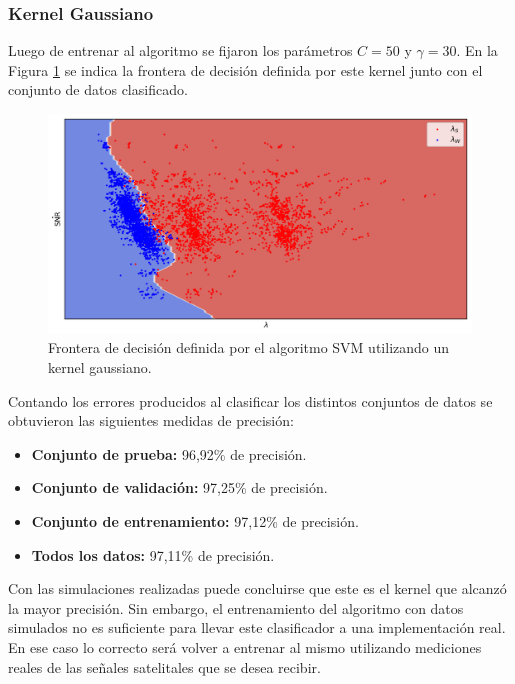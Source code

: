 \subsubsection{Kernel Gaussiano}
Luego de entrenar al algoritmo se fijaron los parámetros $C=50$ y $\gamma=30$. En la Figura \ref{fig:ml_svm_rbf} se indica la frontera de decisión definida por este kernel junto con el conjunto de datos clasificado.

\begin{figure}[ht!]
  \centering
  \includegraphics[width=0.9\linewidth]{images/05-Machine Learning/ml_svm_rbf.png}
  \caption{Frontera de decisión definida por el algoritmo SVM utilizando un kernel gaussiano.}
  \label{fig:ml_svm_rbf}
\end{figure}

Contando los errores producidos al clasificar los distintos conjuntos de datos se obtuvieron las siguientes medidas de precisión:
\begin{itemize}
  \item \textbf{Conjunto de prueba:} 96,92\% de precisión.
  \item \textbf{Conjunto de validación:} 97,25\% de precisión.
  \item \textbf{Conjunto de entrenamiento:} 97,12\% de precisión.
  \item \textbf{Todos los datos:} 97,11\% de precisión.
\end{itemize}

Con las simulaciones realizadas puede concluirse que este es el kernel que alcanzó la mayor precisión. Sin embargo, el entrenamiento del algoritmo con datos simulados no es suficiente para llevar este clasificador a una implementación real. En ese caso lo correcto será volver a entrenar al mismo utilizando mediciones reales de las señales satelitales que se desea recibir.